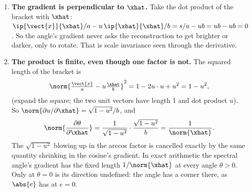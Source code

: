 \begin{enumerate}
\item \textbf{The gradient is perpendicular to $\xhat$.} Take the dot product of the bracket
with $\xhat$: $\ip{\vect{x}}{\xhat}/a - u\,\ip{\xhat}{\xhat}/b = s/a - u b = ub - ub = 0$. So
the angle's gradient never asks the reconstruction to get brighter or darker, only to rotate.
That is scale invariance seen through the derivative.
\item \textbf{The product is finite, even though one factor is not.} The squared length of the
bracket is
\[
\norm{\tfrac{\vect{x}}{a} - u\tfrac{\xhat}{b}}^2 = 1 - 2u\cdot u + u^2 = 1 - u^2,
\]
(expand the square; the two unit vectors have length 1 and dot product $u$). So
$\norm{\partial u/\partial \xhat} = \sqrt{1 - u^2}/b$, and
\[
\norm{\frac{\partial\theta}{\partial\xhat}} = \frac{1}{\sqrt{1 - u^2}}\cdot\frac{\sqrt{1-u^2}}{b} = \frac{1}{\norm{\xhat}} .
\]
The $\sqrt{1 - u^2}$ blowing up in the arccos factor is cancelled exactly by the same quantity
shrinking in the cosine's gradient. In exact arithmetic the spectral angle's gradient has the
fixed length $1/\norm{\xhat}$ at every angle $\theta > 0$. Only at $\theta = 0$ is its direction
undefined: the angle has a corner there, as $\abs{e}$ has at $e = 0$.
\end{enumerate}

